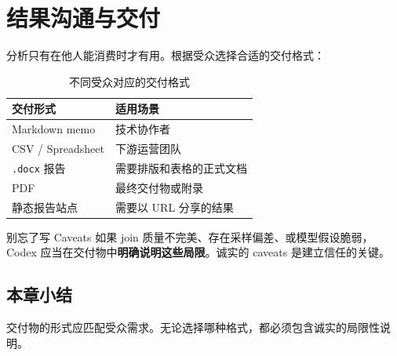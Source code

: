 \section{结果沟通与交付}

分析只有在他人能消费时才有用。根据受众选择合适的交付格式：

\begin{table}[H]
\centering
\begin{tabular}{ll}
\toprule
\textbf{交付形式} & \textbf{适用场景} \\
\midrule
Markdown memo & 技术协作者 \\
CSV / Spreadsheet & 下游运营团队 \\
\texttt{.docx} 报告 & 需要排版和表格的正式文档 \\
PDF & 最终交付物或附录 \\
静态报告站点 & 需要以 URL 分享的结果 \\
\bottomrule
\end{tabular}
\caption{不同受众对应的交付格式}
\end{table}

\begin{importantbox}{别忘了写 Caveats}
如果 join 质量不完美、存在采样偏差、或模型假设脆弱，Codex 应当在交付物中\textbf{明确说明这些局限}。诚实的 caveats 是建立信任的关键。
\end{importantbox}

\subsection{本章小结}
交付物的形式应匹配受众需求。无论选择哪种格式，都必须包含诚实的局限性说明。

